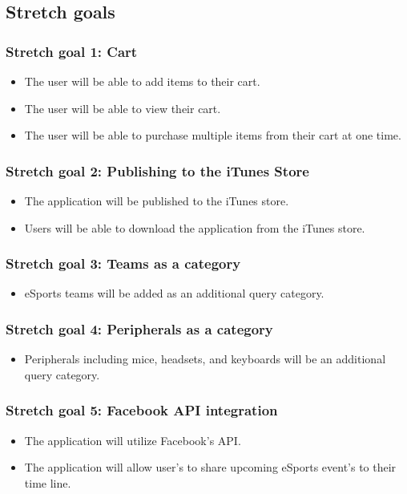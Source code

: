 \documentclass[onecolumn, draftclsnofoot,10pt, compsoc]{IEEEtran}
\begin{document}
\subsection{Stretch goals}

\subsubsection{Stretch goal 1: Cart}
\begin{itemize}
\item The user will be able to add items to their cart.
\item The user will be able to view their cart.
\item The user will be able to purchase multiple items from their cart at one time.
\end{itemize}

\subsubsection{Stretch goal 2: Publishing to the iTunes Store}
\begin{itemize}
\item The application will be published to the iTunes store.
\item Users will be able to download the application from the iTunes store.
\end{itemize}

\subsubsection{Stretch goal 3: Teams as a category}
\begin{itemize}
\item eSports teams will be added as an additional query category.
\end{itemize}

\subsubsection{Stretch goal 4: Peripherals as a category}
\begin{itemize}
\item Peripherals including mice, headsets, and keyboards will be an additional query category.
\end{itemize}

\subsubsection{Stretch goal 5: Facebook API integration}
\begin{itemize}
\item The application will utilize Facebook's API.
\item The application will allow user's to share upcoming eSports event's to their time line.
\end{itemize}
\end{document}
